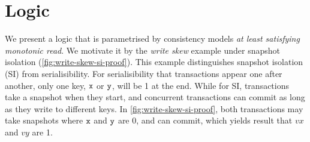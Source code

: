 \section{Logic}

We present a logic that is parametrised by consistency models \emph{at least satisfying monotonic read}.
We motivate it by the \emph{write skew} example under snapshot isolation (\cref{fig:write-skew-si-proof}).
This example distinguishes snapshot isolation (SI) from serialisibility.
For serialisibility that transactions appear one after another, only one key, \( \texttt{x} \) or \( \texttt{y} \), will be 1 at the end.
While for SI, transactions take a snapshot when they start, and concurrent transactions can commit as long as they write to different keys.
In \cref{fig:write-skew-si-proof}, both transactions may take snapshots where \( \texttt{x} \) and \( \texttt{y} \) are 0, and can commit, which yields result that \( vx \) and \( vy \) are 1.

